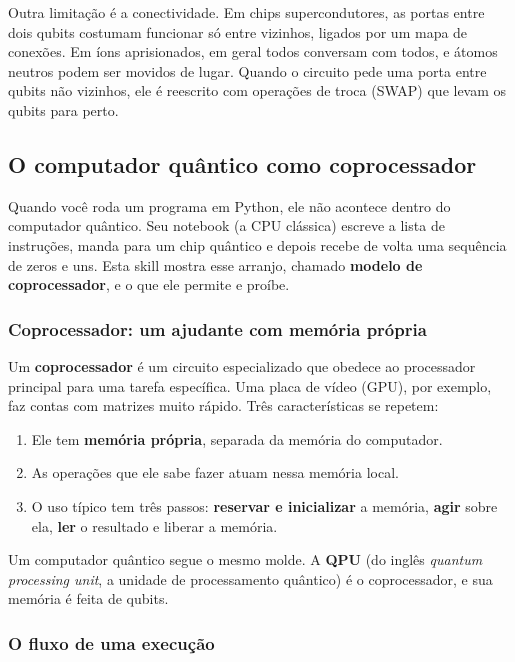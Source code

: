 Outra limitação é a conectividade. Em chips supercondutores, as portas entre dois qubits costumam funcionar só entre vizinhos, ligados por um mapa de conexões. Em íons aprisionados, em geral todos conversam com todos, e átomos neutros podem ser movidos de lugar. Quando o circuito pede uma porta entre qubits não vizinhos, ele é reescrito com operações de troca (SWAP) que levam os qubits para perto.

\subsection{O computador quântico como coprocessador}
Quando você roda um programa em Python, ele não acontece dentro do computador quântico. Seu notebook (a CPU clássica) escreve a lista de instruções, manda para um chip quântico e depois recebe de volta uma sequência de zeros e uns. Esta skill mostra esse arranjo, chamado \textbf{modelo de coprocessador}, e o que ele permite e proíbe.

\subsubsection{Coprocessador: um ajudante com memória própria}\label{coprocessador-um-ajudante-com-memuxf3ria-pruxf3pria}

Um \textbf{coprocessador} é um circuito especializado que obedece ao processador principal para uma tarefa específica. Uma placa de vídeo (GPU), por exemplo, faz contas com matrizes muito rápido. Três características se repetem:

\begin{enumerate}
\def\labelenumi{\arabic{enumi}.}
\tightlist
\item
  Ele tem \textbf{memória própria}, separada da memória do computador.
\item
  As operações que ele sabe fazer atuam nessa memória local.
\item
  O uso típico tem três passos: \textbf{reservar e inicializar} a memória, \textbf{agir} sobre ela, \textbf{ler} o resultado e liberar a memória.
\end{enumerate}

Um computador quântico segue o mesmo molde. A \textbf{QPU} (do inglês \emph{quantum processing unit}, a unidade de processamento quântico) é o coprocessador, e sua memória é feita de qubits.

\subsubsection{O fluxo de uma execução}\label{o-fluxo-de-uma-execuuxe7uxe3o}

